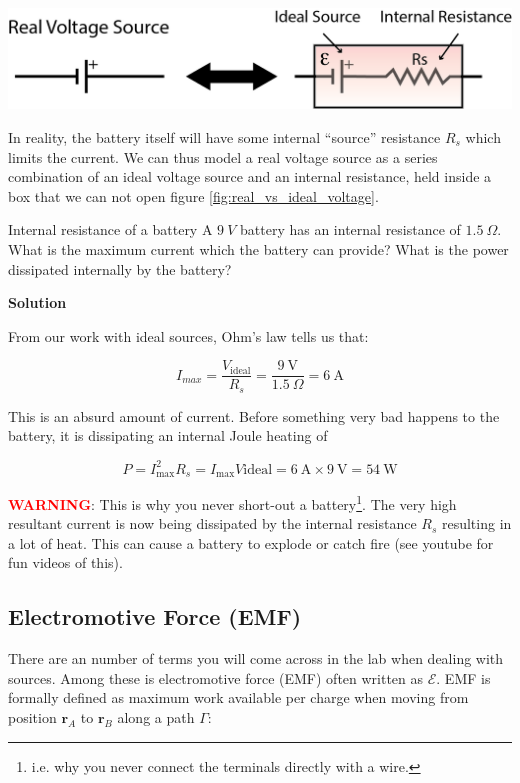 \documentclass{tufte-book}
\newcommand\Solution{\par\textbf{\textsf{Solution}}\par\medskip}
\begin{document}
\begin{marginfigure}
\caption{A real voltage source is modelled as an ideal source in series with an internal resistance.}
\label{fig:real_vs_ideal_voltage}
\includegraphics{real_vs_ideal_voltage}
\end{marginfigure}

In reality, the battery itself will have some internal ``source'' resistance $R_s$ which limits the current. We can thus model a real voltage source as a series combination of an ideal voltage source and an internal resistance, held inside a box that we can not open figure \ref{fig:real_vs_ideal_voltage}.



\begin{myexample}[label = ex:popquiz_intresistance]{Internal resistance of a battery}
A $9~V$ battery has an internal resistance of $1.5~\Omega$. What is the maximum current which the battery can provide? What is the power dissipated internally by the battery?

\Solution
From our work with ideal sources, Ohm's law tells us that:

$$
I_{max} = \frac{V_\text{ideal}}{R_s} = \frac{9~\text{V}}{1.5~\Omega} = 6~\text{A}
$$

\noindent This is an absurd amount of current. Before something very bad happens to the battery, it is dissipating an internal Joule heating of

$$
P = I^2_\text{max}R_s = I_\text{max}V\text{ideal} = 6~\text{A}\times9~\text{V} = 54~\text{W}
$$
\end{myexample}

\noindent  \textcolor{red}{\textbf{WARNING}}: This is why you never short-out a battery\footnote{i.e. why you never connect the terminals directly with a wire.}. The very high resultant current is now being dissipated by the internal resistance $R_s$ resulting in a lot of heat. This can cause a battery to explode or catch fire (see youtube for fun videos of this).

\subsection{Electromotive Force (EMF)}
There are an number of terms you will come across in the lab when dealing with sources. Among these is electromotive force (EMF) often written as $\mathcal{E}$. EMF is formally defined as maximum work available per charge when moving from position $\textbf{r}_A$ to $\textbf{r}_B$ along a path $\Gamma$:
\end{document}
